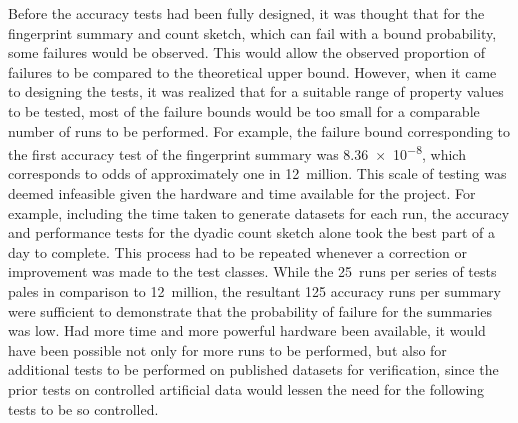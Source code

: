 Before the accuracy tests had been fully designed, it was thought that for the fingerprint summary and count sketch, which can fail with a bound probability, some failures would be observed.
This would allow the observed proportion of failures to be compared to the theoretical upper bound.
However, when it came to designing the tests, it was realized that for a suitable range of property values to be tested, most of the failure bounds would be too small for a comparable number of runs to be performed.
For example, the failure bound corresponding to the first accuracy test of the fingerprint summary was \num{8.36e-8}, which corresponds to odds of approximately one in \num{12}~million.
This scale of testing was deemed infeasible given the hardware and time available for the project.
For example, including the time taken to generate datasets for each run, the accuracy and performance tests for the dyadic count sketch alone took the best part of a day to complete.
This process had to be repeated whenever a correction or improvement was made to the test classes.
While the \num{25}~runs per series of tests pales in comparison to \num{12}~million, the resultant \num{125} accuracy runs per summary were sufficient to demonstrate that the probability of failure for the summaries was low.
Had more time and more powerful hardware been available, it would have been possible not only for more runs to be performed, but also for additional tests to be performed on published datasets for verification, since the prior tests on controlled artificial data would lessen the need for the following tests to be so controlled.

